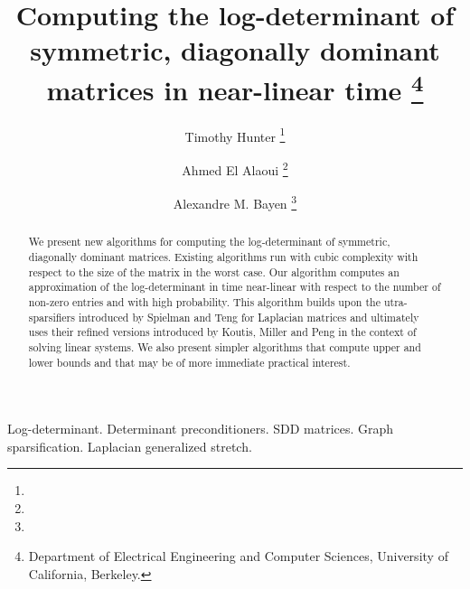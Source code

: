 \documentclass[11pt,onefignum,onetabnum]{siamltex}
\title{Computing the log-determinant of symmetric, diagonally dominant matrices
in near-linear time \thanks{Department of Electrical Engineering and Computer Sciences, University of California, Berkeley.}}
\author{Timothy Hunter \thanks{\email{tjhunter@eecs.berkeley.edu}}\and 
Ahmed {El Alaoui} \thanks{\email{elalaoui@eecs.berkeley.edu}}\and
Alexandre M. Bayen \thanks{\email{bayen@berkeley.edu}}}
\begin{document}
\maketitle
{}%

\begin{abstract}
We present new algorithms for computing the log-determinant of symmetric,
diagonally dominant matrices. Existing algorithms run with cubic complexity
with respect to the size of the matrix in the worst case. Our algorithm 
computes an approximation of the log-determinant in time near-linear with 
respect to the number of non-zero entries and with high probability. This 
algorithm builds upon the utra-sparsifiers introduced by Spielman and Teng for
Laplacian matrices and ultimately uses their refined versions introduced by Koutis, Miller and Peng in the context of solving linear systems. We also present simpler algorithms that compute upper and 
lower bounds and that may be of more immediate practical interest.
\end{abstract}

\begin{keywords}
Log-determinant.
Determinant preconditioners.
SDD matrices.
Graph sparsification.
Laplacian generalized stretch.
\end{keywords}

\begin{AMS}\end{AMS}


\pagestyle{myheadings}

\thispagestyle{plain}














% 

% 
\end{document}
